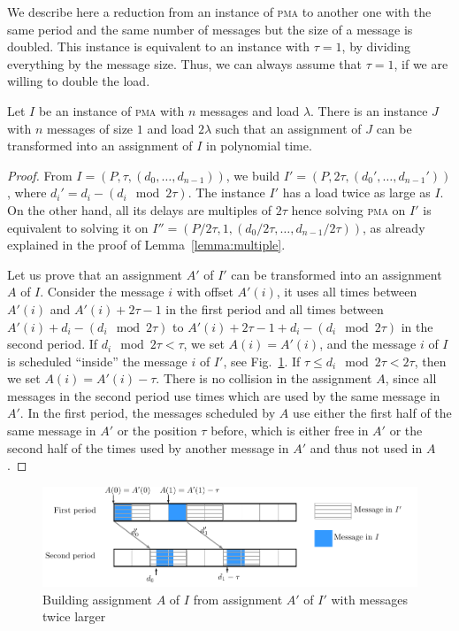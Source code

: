 \documentclass[a4paper,UKenglish,cleveref, autoref, thm-restate]{lipics-v2019}
\newcommand\pma{\textsc{pma}\xspace}
\begin{document}
We describe here a reduction from an instance of \pma to another one with the same period and the same number of messages but the size of a message is doubled. This instance is equivalent to an instance with $\tau = 1$, by dividing everything by the message size. Thus, we can always assume that $\tau = 1$, if we are willing to double the load.


\begin{theorem}\label{th:double_load}
Let $I$ be an instance of \pma with $n$ messages and load $\lambda$. There is an instance $J$ with $n$ messages of size $1$
and load $2\lambda$ such that an assignment of $J$ can be transformed into an assignment of $I$ in polynomial time.
\end{theorem}
\begin{proof}
From $I = (P,\tau,(d_{0},\dots,d_{n-1}))$, we build $I' = (P, 2\tau, (d_{0}',\dots,d_{n-1}'))$, where $d_i' = d_{i} - (d_{i} \mod 2\tau)$. The instance $I'$ has a load twice as large as $I$.
On the other hand, all its delays are multiples of $2\tau$ hence solving \pma on $I'$ is equivalent to solving it on $I'' = (P/2\tau, 1,(d_{0}/ 2\tau,\dots,d_{n-1} /2\tau))$, as already explained in the proof of Lemma~\ref{lemma:multiple}. 

Let us prove that an assignment $A'$ of $I'$ can be transformed into an assignment $A$ of $I$. 
Consider the message $i$ with offset $A'(i)$, it uses all times between $A'(i)$ and $A'(i) + 2\tau -1$ in the first period and all times between $A'(i) + d_{i} - (d_{i} \mod 2\tau)$ to $A'(i) + 2\tau -1+ d_{i} - (d_{i} \mod 2\tau)$ in the second period. 
If $d_{i} \mod 2\tau < \tau $, we set $A(i) = A'(i)$, and the message $i$ of $I$ is scheduled ``inside'' the 
message $i$ of $I'$, see Fig.~\ref{fig:transf_2tau}. If $\tau \leq d_{i} \mod 2\tau < 2\tau$, then we set 
$A(i) = A'(i) - \tau$. There is no collision in the assignment $A$, since all messages in the second period use
times which are used by the same message in $A'$. In the first period, the messages scheduled by $A$ use either the first
half of the same message in $A'$ or the position $\tau$ before, which is either free in $A'$ or the second half of the times used by another message in $A'$ and thus not used in $A$. 
\end{proof}
\begin{figure}[h]
\begin{center}

\includegraphics[scale=0.7]{transfo2tau}
\end{center}
\caption{Building assignment $A$ of $I$ from assignment $A'$ of $I'$ with messages twice larger}
\label{fig:transf_2tau}
\end{figure}
\end{document}
